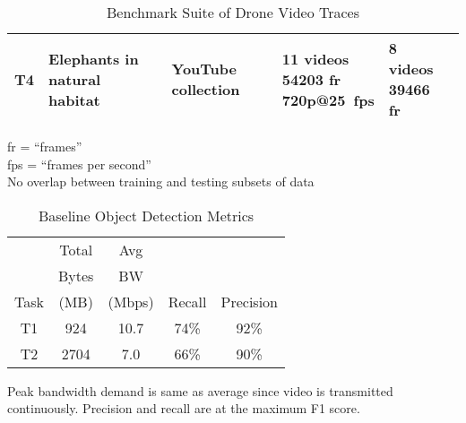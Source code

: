 \begin{table}
\begin{tabular}{|p{1cm}|p{2.5cm}|p{2.5cm}|p{2.5cm}|p{2.5cm}|p{2.5cm}|}
    T4   & {\small Elephants in natural habitat}   & {\small YouTube collection~\cite{YouTube2}}           & \makecell[tl]{\small 11 videos                      \\\small 54203 fr\\\small 720p@25~fps}&\makecell[tl]{\small 8 videos\\\small 39466 fr} & \\ \cline{1-5}
    \hline
  \end{tabular}
  \vspace{0.1in}
  \begin{captiontext}
    fr = ``frames''\\
    fps = ``frames per second''\\
    No overlap between training and testing subsets of data
  \end{captiontext}
  \caption{Benchmark Suite of Drone Video Traces}
  \label{fig:benchmarksuite}
\end{table}

\begin{table}
  \centering
  \begin{tabular}{|c|c|c|c|c|}
    \hline
         & Total          & Avg            &        &           \\
         & Bytes          & BW             &        &           \\
    Task & (MB)           & (Mbps)         & Recall & Precision \\

    \hline
    T1   & \phantom{0}924 & 10.7           & 74\%   & 92\%      \\
    \hline
    T2   & 2704           & \phantom{0}7.0 & 66\%   & 90\%      \\
    \hline
  \end{tabular}
  \vspace{0.2in}
  \begin{captiontext}
    Peak bandwidth demand is same as average since video is transmitted
    continuously. Precision and recall are at the maximum F1 score.
  \end{captiontext}
  \caption{Baseline Object Detection Metrics}
  \label{fig:baseline}
\end{table}

